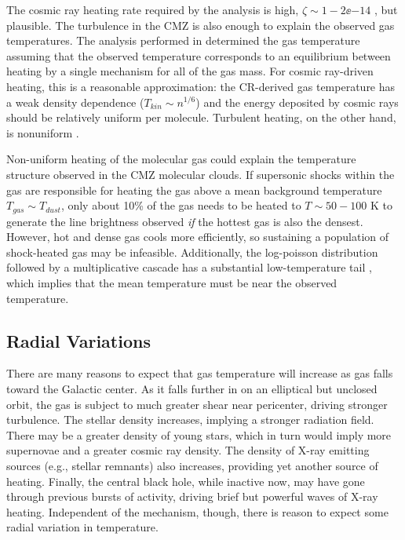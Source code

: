The cosmic ray heating rate required by the \citet{Ao2013a} analysis is high,
$\zeta\sim1-2\ee{-14}$ \pers, but plausible.  The turbulence in the CMZ is also
enough to explain the observed gas temperatures. 
The analysis performed in \citet{Ao2013a} determined the gas temperature
assuming that the observed temperature corresponds to an equilibrium between
heating by a single mechanism for all of the gas mass.  For cosmic ray-driven
heating, this is a reasonable approximation: the CR-derived gas temperature
has a weak density dependence ($T_{kin}\sim n^{1/6}$) and the energy deposited
by cosmic rays should be relatively uniform per molecule.  Turbulent heating,
on the other hand, is nonuniform \citep{Pan2009a}.

Non-uniform heating of the molecular gas could explain the temperature
structure observed in the CMZ molecular clouds.  If supersonic shocks within
the gas are responsible for heating the gas above a mean background temperature
$T_{gas} \sim T_{dust}$, only about 10\% of the gas needs to be heated to
$T\sim50-100$ K to generate the line brightness observed \emph{if} the hottest
gas is also the densest.  However, hot and dense gas cools more efficiently, so
sustaining a population of shock-heated gas may be infeasible.  Additionally,
the log-poisson distribution followed by a multiplicative cascade has a substantial
low-temperature tail \citep{Pan2009a}, which implies that the mean temperature
must be near the observed temperature.  



\subsection{Radial Variations}
There are many reasons to expect that gas temperature will increase as gas
falls toward the Galactic center.  As it falls further in on an elliptical but
unclosed orbit, the gas is subject to much greater shear near pericenter,
driving stronger turbulence.  The stellar density increases, implying a
stronger radiation field.  There may be a
greater density of young stars, which in turn would imply more supernovae and a
greater cosmic ray density.  The density of X-ray emitting sources (e.g.,
stellar remnants) also increases, providing yet another source of heating.
Finally, the central black hole, while inactive now, may have gone through
previous bursts of activity, driving brief but powerful waves of X-ray heating.
Independent of the mechanism, though, there is reason to expect some radial
variation in temperature.

